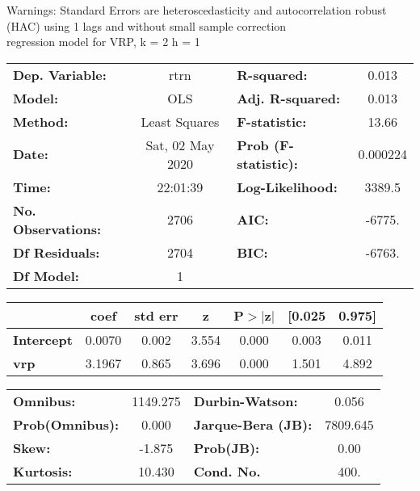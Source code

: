 Warnings: \newline
 [1] Standard Errors are heteroscedasticity and autocorrelation robust (HAC) using 1 lags and without small sample correction\\ 

regression model for VRP, k = 2 h = 1\begin{center}
\begin{tabular}{lclc}
\toprule
\textbf{Dep. Variable:}    &       rtrn       & \textbf{  R-squared:         } &     0.013   \\
\textbf{Model:}            &       OLS        & \textbf{  Adj. R-squared:    } &     0.013   \\
\textbf{Method:}           &  Least Squares   & \textbf{  F-statistic:       } &     13.66   \\
\textbf{Date:}             & Sat, 02 May 2020 & \textbf{  Prob (F-statistic):} &  0.000224   \\
\textbf{Time:}             &     22:01:39     & \textbf{  Log-Likelihood:    } &    3389.5   \\
\textbf{No. Observations:} &        2706      & \textbf{  AIC:               } &    -6775.   \\
\textbf{Df Residuals:}     &        2704      & \textbf{  BIC:               } &    -6763.   \\
\textbf{Df Model:}         &           1      & \textbf{                     } &             \\
\bottomrule
\end{tabular}
\begin{tabular}{lcccccc}
                   & \textbf{coef} & \textbf{std err} & \textbf{z} & \textbf{P$> |$z$|$} & \textbf{[0.025} & \textbf{0.975]}  \\
\midrule
\textbf{Intercept} &       0.0070  &        0.002     &     3.554  &         0.000        &        0.003    &        0.011     \\
\textbf{vrp}       &       3.1967  &        0.865     &     3.696  &         0.000        &        1.501    &        4.892     \\
\bottomrule
\end{tabular}
\begin{tabular}{lclc}
\textbf{Omnibus:}       & 1149.275 & \textbf{  Durbin-Watson:     } &    0.056  \\
\textbf{Prob(Omnibus):} &   0.000  & \textbf{  Jarque-Bera (JB):  } & 7809.645  \\
\textbf{Skew:}          &  -1.875  & \textbf{  Prob(JB):          } &     0.00  \\
\textbf{Kurtosis:}      &  10.430  & \textbf{  Cond. No.          } &     400.  \\
\bottomrule
\end{tabular}
\end{center}

